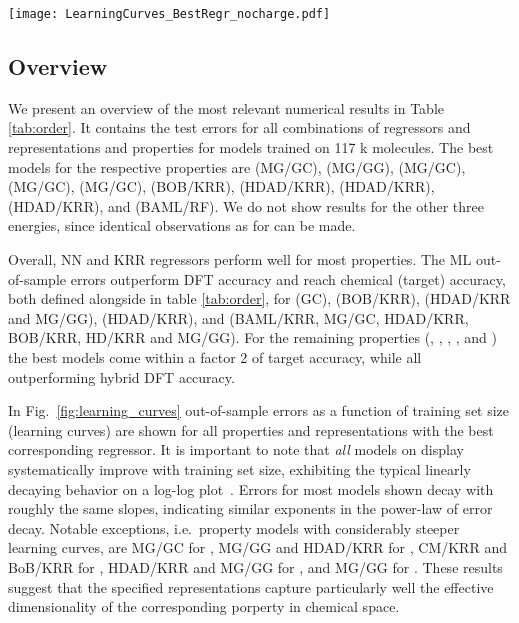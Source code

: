 \documentclass[reprint, superscriptaddress,
amsmath,amssymb, aps, prb,
]{revtex4-1}
\begin{document}
{\begin{figure*}[h!]
 \texttt{[image: LearningCurves\_BestRegr\_nocharge.pdf]}
 \caption{ \label{fig:learning_curves}
Learning curves (mean absolute error (MAE) as a function of training set size )
  for 10 properties of QM9 molecules, displaying the best regressor for each representation and property.
  Horizontal solid lines correspond to target accuracies, vertical dotted lines correspond to approximated B3LYP accuracies (unless off-chart), see also table \ref{tab:order}. Note that due to its poor performance ECFP4 results have been excluded for , , ,  and .  
  }
  
\end{figure*}

\subsection{Overview}
We present an overview of the most relevant numerical results in Table \ref{tab:order}. 
It contains the test errors for all combinations of regressors and representations and properties for
models trained on 117 k molecules. 
The best models for the respective properties are 
 (MG/GC), 
 (MG/GG), 
 (MG/GC), 
 (MG/GC), 
 (MG/GC), 
 (BOB/KRR),
 (HDAD/KRR),
 (HDAD/KRR), 
 (HDAD/KRR),
and  (BAML/RF).
We do not show results for the other three energies,  since identical observations as for  can be made.

Overall, NN and KRR regressors perform well for most properties. 
The ML out-of-sample errors outperform DFT accuracy and reach chemical (target) accuracy, both defined alongside in table \ref{tab:order}, for  (GC),  (BOB/KRR),  (HDAD/KRR and MG/GG),  (HDAD/KRR), and  (BAML/KRR, MG/GC, HDAD/KRR, BOB/KRR, HD/KRR and MG/GG). 
For the remaining properties (, , , , and ) the 
best models come within a factor 2 of target accuracy, while all outperforming hybrid DFT accuracy. 


In Fig.~\ref{fig:learning_curves} out-of-sample errors as a function of training set size (learning curves) are shown for all properties and representations with the best corresponding regressor. It is important to note that {\em all} models on display systematically improve
with training set size, exhibiting the typical linearly decaying behavior on a log-log plot~\cite{Muller1996,BAML}. 
Errors for most models shown decay with roughly the same slopes, 
indicating similar exponents in the power-law of error decay. 
Notable exceptions, i.e.~property models with considerably steeper learning curves, are
MG/GC for , MG/GG and HDAD/KRR for , CM/KRR and BoB/KRR for , HDAD/KRR and MG/GG for , and MG/GG for .
These results suggest that the specified representations capture particularly well the effective dimensionality of the corresponding porperty in chemical space. 



}
\end{document}
